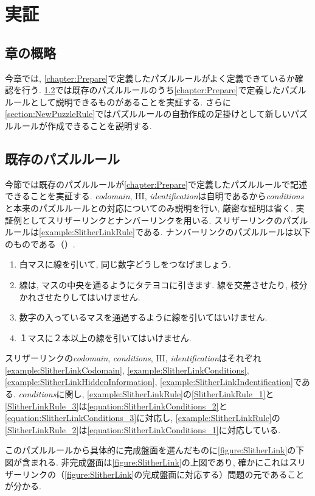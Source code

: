 \chapter{実証}\label{chapter:Demonstration}
\section{章の概略}
今章では, \cref{chapter:Prepare}で定義したパズルルールがよく定義できているか確認を行う. \cref{section:ExistsPuzzleRule}では既存のパズルルールのうち\cref{chapter:Prepare}で定義したパズルルールとして説明できるものがあることを実証する. さらに\cref{section:NewPuzzleRule}ではパズルルールの自動作成の足掛けとして新しいパズルルールが作成できることを説明する.

\section{既存のパズルルール}\label{section:ExistsPuzzleRule}
今節では既存のパズルルールが\cref{chapter:Prepare}で定義したパズルルールで記述できることを実証する. \textit{codomain}, HI, \textit{identification}は自明であるから\textit{conditions}と本来のパズルルールとの対応についてのみ説明を行い, 厳密な証明は省く.
実証例としてスリザーリンクとナンバーリンクを用いる. スリザーリンクのパズルルールは\cref{example:SlitherLinkRule}である. ナンバーリンクのパズルルールは以下のものである（\cite{web:NumberLink}）.
\begin{example}[ナンバーリンクのパズルルール]\label{example:NumberLinkRule}\textup{}
  \begin{enumerate}
    \item 白マスに線を引いて, 同じ数字どうしをつなげましょう.\label{NumberLinkRule_1}
    \item 線は, マスの中央を通るようにタテヨコに引きます. 線を交差させたり, 枝分かれさせたりしてはいけません.\label{NumberLinkRule_2}
    \item 数字の入っているマスを通過するように線を引いてはいけません.\label{NumberLinkRule_3}
    \item １マスに２本以上の線を引いてはいけません.\label{NumberLinkRule_4}
  \end{enumerate}
\end{example}

\begin{example}[スリザーリンクの数学的記述]
  スリザーリンクの\textit{codomain}, \textit{conditions}, HI, \textit{identification}はそれぞれ\cref{example:SlitherLinkCodomain}, \cref{example:SlitherLinkConditions}, \cref{example:SlitherLinkHiddenInformation}, \cref{example:SlitherLinkIndentification}である. \textit{conditions}に関し, \cref{example:SlitherLinkRule}の\ref{SlitherLinkRule_1}と\ref{SlitherLinkRule_3}は\cref{equation:SlitherLinkConditions_2}と\cref{equation:SlitherLinkConditions_3}に対応し, \cref{example:SlitherLinkRule}の\ref{SlitherLinkRule_2}は\cref{equation:SlitherLinkConditions_1}に対応している.

  このパズルルールから具体的に完成盤面を選んだものに\cref{figure:SlitherLink}の下図が含まれる. 非完成盤面は\cref{figure:SlitherLink}の上図であり, 確かにこれはスリザーリンクの（\cref{figure:SlitherLink}の完成盤面に対応する）問題の元であることが分かる.
\end{example}

